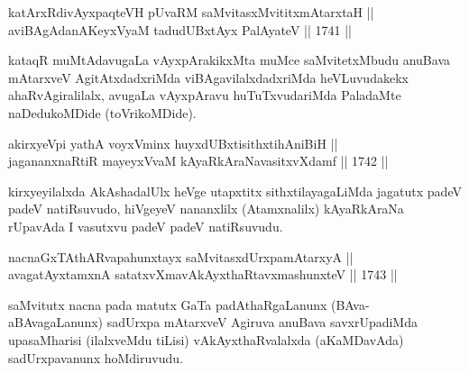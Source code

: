 \begin{shl}
katArxRdivAyxpaqteVH pUvaRM saMvitasxMvititxmAtarxtaH || \\
aviBAgAdanAKeyxVyaM \footnotemark[3]tadudUBxtAyx PalAyateV \hfill || 1741 ||  
\end{shl}

\begin{artha}
kataqR muMtAdavugaLa vAyxpArakikxMta muMce
saMvitetxMbudu anuBava mAtarxveV AgitAtxdadxriMda
viBAgavilalxdadxriMda heVLuvudakekx
ahaRvAgiralilalx, \footnotemark[2]avugaLa vAyxpAravu huTuTxvudariMda
PaladaMte naDedukoMDide (toVrikoMDide).
\end{artha}


\begin{shl}
akirxyeV\s pi yathA voyxVminx huyxdUBxtisithxtihAniBiH || \\
jagananxnaRtiR mayeyxVvaM kAyaRkAraNavasitxvXdamf \hfill || 1742 ||  
\end{shl}

\begin{artha}
kirxyeyilalxda AkAshadalUlx heVge utapxtitx sithxtilayagaLiMda
jagatutx padeV padeV natiRsuvudo, hiVgeyeV nananxlilx (Atamxnalilx)
kAyaRkAraNa rUpavAda I vasutxvu padeV padeV natiRsuvudu.
\end{artha}


\begin{shl}
nacnaGxTAthARvapahunxtayx saMvitasxdUrxpamAtarxyA ||  \\
avagatAyxtamxnA satatxvXmavAkAyxthaRtavxmashunxteV \hfill || 1743 || 
\end{shl}

\begin{artha}
saMvitutx nacna pada matutx GaTa padAthaRgaLanunx (BAva-aBAvagaLanunx)
sadUrxpa mAtarxveV Agiruva anuBava savxrUpadiMda upasaMharisi
(ilalxveMdu tiLisi) vAkAyxthaRvalalxda (aKaMDavAda) sadUrxpavanunx
hoMdiruvudu.
\end{artha}

